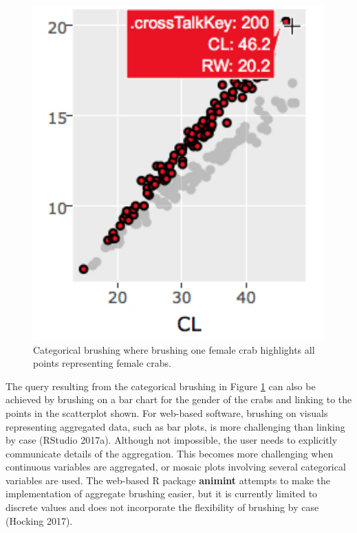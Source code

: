 \documentclass[]{book}
\theoremstyle{definition}
\theoremstyle{definition}
\theoremstyle{definition}
\theoremstyle{remark}
\begin{document}
\begin{figure}[center]
\includegraphics[width=700px]{files/catbrush} \caption{Categorical brushing where brushing one female crab highlights all points representing female crabs.}\label{fig:catbrush}
\end{figure}

The query resulting from the categorical brushing in Figure
\ref{fig:catbrush} can also be achieved by brushing on a bar chart for
the gender of the crabs and linking to the points in the scatterplot
shown. For web-based software, brushing on visuals representing
aggregated data, such as bar plots, is more challenging than linking by
case (RStudio 2017a). Although not impossible, the user needs to
explicitly communicate details of the aggregation. This becomes more
challenging when continuous variables are aggregated, or mosaic plots
involving several categorical variables are used. The web-based R
package \textbf{animint} attempts to make the implementation of
aggregate brushing easier, but it is currently limited to discrete
values and does not incorporate the flexibility of brushing by case
(Hocking 2017).
\end{document}
